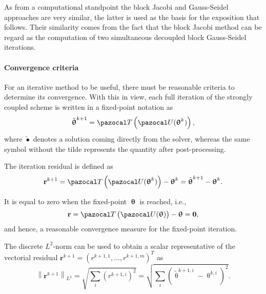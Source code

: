 As from a computational standpoint the block Jacobi and Gauss-Seidel approaches are very similar, the latter is used as the basis for the exposition that follows.
Their similarity comes from the fact that the block Jacobi method can be regard as the computation of two simultaneous decoupled block Gauss-Seidel iterations.

\paragraph{Convergence criteria}

For an iterative method to be useful, there must be reasonable criteria to determine its convergence.
With this in view, each full iteration of the strongly coupled scheme is written in a fixed-point notation as
\begin{equation} \label{eq:fixed_point_iteration}
\tilde{\bm \uptheta}^{k+1} = \pazocal T \left(\pazocal U(\bm \uptheta^k)\right),
\end{equation}
where $\tilde{\bullet}$ denotes a solution coming directly from the solver, whereas the same symbol without the tilde represents the quantity after post-processing.

The iteration residual is defined as
\begin{equation}
\mathbf r^{k+1} = \pazocal T\left(\pazocal U(\bm\uptheta^k)\right) - \bm\uptheta^k = \tilde{\bm \uptheta}^{k+1} - \bm\uptheta^k.
\end{equation}

It is equal to zero when the fixed-point $\bm \uptheta$ is reached, i.e.,
\begin{equation} \label{eq:residual_definition}
\mathbf r = \pazocal T\left(\pazocal U(\bm \uptheta)\right) - \bm \uptheta = \mathbf 0,
\end{equation}
and hence, a reasonable convergence measure for the fixed-point iteration.

The discrete  $L^{2}$-norm can be used to obtain a scalar representative of the vectorial residual \(\mathbf r^{k+1}=\left(r^{k+1,1}, \ldots, r^{k+1,m}\right)^{T}\) as
\begin{equation} \label{eq:absolute_residual_criterion}
\left\|\mathbf{r}^{k+1}\right\|_{L^{2}}=\sqrt{\sum_{i}\left(r^{k+1, i}\right)^{2}}=\sqrt{\sum_{i}\left(\tilde{\uptheta}^{k+1, i}-\uptheta^{k, i}\right)^{2}}.
\end{equation}

